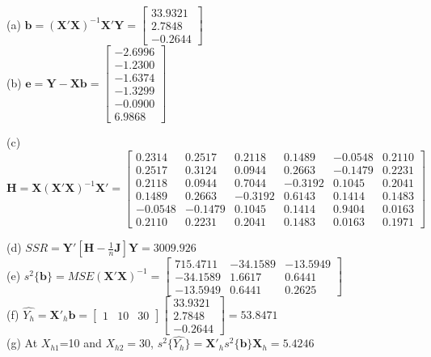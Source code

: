 \documentclass[12pt]{article}
\begin{document}
{\vfill
  \answer
}{
(a) $\textbf{b}=(\textbf{X}'\textbf{X})^{-1}\textbf{X}'\textbf{Y}=\begin{bmatrix}33.9321\\2.7848\\-0.2644\end{bmatrix}$\\

(b)
$\textbf{e}=\textbf{Y}-\textbf{X}\textbf{b}=\begin{bmatrix}-2.6996\\-1.2300\\-1.6374\\-1.3299\\-0.0900\\6.9868\end{bmatrix}$

(c)
$\textbf{H}=\textbf{X}(\textbf{X}'\textbf{X})^{-1}\textbf{X}'=\begin{bmatrix}0.2314&0.2517&0.2118& 0.1489&-0.0548& 0.2110\\
    0.2517&0.3124&0.0944&0.2663&-0.1479&0.2231\\
    0.2118&0.0944 &0.7044&-0.3192&0.1045&0.2041\\
    0.1489&0.2663&-0.3192&0.6143&0.1414&0.1483\\
   -0.0548&-0.1479&0.1045&0.1414&0.9404&0.0163\\
    0.2110&0.2231&0.2041&0.1483&0.0163&0.1971\end{bmatrix}$

(d)  $SSR=\textbf{Y}'[\textbf{H}-\frac{1}{n}\textbf{J}]\textbf{Y}=3009.926$\\
(e)  $s^2\{\textbf{b}\}=MSE(\textbf{X}'\textbf{X})^{-1}
=\begin{bmatrix}715.4711&-34.1589&-13.5949\\-34.1589&1.6617&0.6441\\-13.5949&0.6441&0.2625\end{bmatrix}$\\

(f) $\hat{Y_h}=\textbf{X}'_h\textbf{b}=\begin{bmatrix}1&10&30\end{bmatrix}\begin{bmatrix}33.9321\\2.7848\\-0.2644\end{bmatrix}=53.8471$\\

(g) At $X_{h1}$=10 and $X_{h2}=30$, $ s^2\{\hat{Y_h}\}=\textbf{X}'_h s^2\{\textbf{b}\}\textbf{X}_h=5.4246$

}
\end{document}
